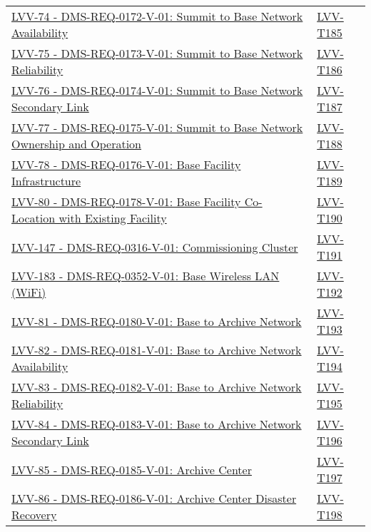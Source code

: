 {\begin{longtable}[]{p{13cm}p{3cm}}
\href{https://jira.lsstcorp.org/browse/LVV-74}{LVV-74 - DMS-REQ-0172-V-01: Summit to Base Network Availability}
& {
\hyperref[lvv-t185]{LVV-T185}
} \\
\href{https://jira.lsstcorp.org/browse/LVV-75}{LVV-75 - DMS-REQ-0173-V-01: Summit to Base Network Reliability}
& {
\hyperref[lvv-t186]{LVV-T186}
} \\
\href{https://jira.lsstcorp.org/browse/LVV-76}{LVV-76 - DMS-REQ-0174-V-01: Summit to Base Network Secondary Link}
& {
\hyperref[lvv-t187]{LVV-T187}
} \\
\href{https://jira.lsstcorp.org/browse/LVV-77}{LVV-77 - DMS-REQ-0175-V-01: Summit to Base Network Ownership and Operation}
& {
\hyperref[lvv-t188]{LVV-T188}
} \\
\href{https://jira.lsstcorp.org/browse/LVV-78}{LVV-78 - DMS-REQ-0176-V-01: Base Facility Infrastructure}
& {
\hyperref[lvv-t189]{LVV-T189}
} \\
\href{https://jira.lsstcorp.org/browse/LVV-80}{LVV-80 - DMS-REQ-0178-V-01: Base Facility Co-Location with Existing Facility}
& {
\hyperref[lvv-t190]{LVV-T190}
} \\
\href{https://jira.lsstcorp.org/browse/LVV-147}{LVV-147 - DMS-REQ-0316-V-01: Commissioning Cluster}
& {
\hyperref[lvv-t191]{LVV-T191}
} \\
\href{https://jira.lsstcorp.org/browse/LVV-183}{LVV-183 - DMS-REQ-0352-V-01: Base Wireless LAN (WiFi)}
& {
\hyperref[lvv-t192]{LVV-T192}
} \\
\href{https://jira.lsstcorp.org/browse/LVV-81}{LVV-81 - DMS-REQ-0180-V-01: Base to Archive Network}
& {
\hyperref[lvv-t193]{LVV-T193}
} \\
\href{https://jira.lsstcorp.org/browse/LVV-82}{LVV-82 - DMS-REQ-0181-V-01: Base to Archive Network Availability}
& {
\hyperref[lvv-t194]{LVV-T194}
} \\
\href{https://jira.lsstcorp.org/browse/LVV-83}{LVV-83 - DMS-REQ-0182-V-01: Base to Archive Network Reliability}
& {
\hyperref[lvv-t195]{LVV-T195}
} \\
\href{https://jira.lsstcorp.org/browse/LVV-84}{LVV-84 - DMS-REQ-0183-V-01: Base to Archive Network Secondary Link}
& {
\hyperref[lvv-t196]{LVV-T196}
} \\
\href{https://jira.lsstcorp.org/browse/LVV-85}{LVV-85 - DMS-REQ-0185-V-01: Archive Center}
& {
\hyperref[lvv-t197]{LVV-T197}
} \\
\href{https://jira.lsstcorp.org/browse/LVV-86}{LVV-86 - DMS-REQ-0186-V-01: Archive Center Disaster Recovery}
& {
\hyperref[lvv-t198]{LVV-T198}
} \\

\end{longtable}}
